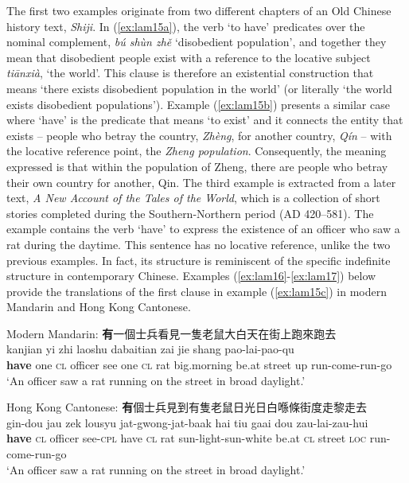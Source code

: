 \documentclass[output=paper]{langscibook}
\begin{document}
The first two examples originate from two different chapters of an Old Chinese history text, \emph{Shiji}. In (\ref{ex:lam15a}), the verb `to have' predicates over the nominal complement, \textit{bú shùn zhě} `disobedient population', and together they mean that disobedient people exist  with a reference to the locative subject \textit{tiānxià}, `the world'. This clause is therefore an existential construction that means `there exists disobedient population in the world' (or literally `the world exists disobedient populations'). Example (\ref{ex:lam15b}) presents a similar case where `have' is the predicate that means `to exist' and it connects the entity that exists – people who betray the country, \emph{Zhèng}, for another country, \emph{Qín} – with the locative reference point, the \emph{Zheng population}. Consequently, the meaning expressed is that within the population of Zheng, there are people who betray their own country for another, Qin. The third example is extracted from a later text, \emph{A New Account of the Tales of the World}, which is a collection of short stories completed during the Southern-Northern period (AD 420–581). The example contains the verb `have' to express the existence of an officer who saw a rat during the daytime. This sentence has no locative reference, unlike the two previous examples. In fact, its structure is reminiscent of the specific indefinite structure in contemporary Chinese. Examples (\ref{ex:lam16}-\ref{ex:lam17}) below provide the translations of the first clause in example (\ref{ex:lam15c}) in modern Mandarin and Hong Kong Cantonese. 

\ea Modern Mandarin: \textbf{有}一個士兵看見一隻老鼠大白天在街上跑來跑去 \label{ex:lam16}\\
   kanjian yi zhi laoshu dabaitian zai jie shang pao-lai-pao-qu\\
 \textbf{have} one \textsc{cl} officer see one \textsc{cl} rat big.morning be.at street	up run-come-run-go\\
  \glt `An officer saw a rat running on the street in broad daylight.'
\z 

\ea Hong Kong Cantonese: \textbf{有}個士兵見到有隻老鼠日光日白喺條街度走黎走去\label{ex:lam17}\\
   gin-dou jau zek lousyu jat-gwong-jat-baak hai	tiu gaai dou zau-lai-zau-hui\\
	\textbf{have} \textsc{cl} officer see-\textsc{cpl} have \textsc{cl} rat sun-light-sun-white be.at \textsc{cl} street \textsc{loc} run-come-run-go\\
	\glt `An officer saw a rat running on the street in broad daylight.'
\z 
\end{document}
